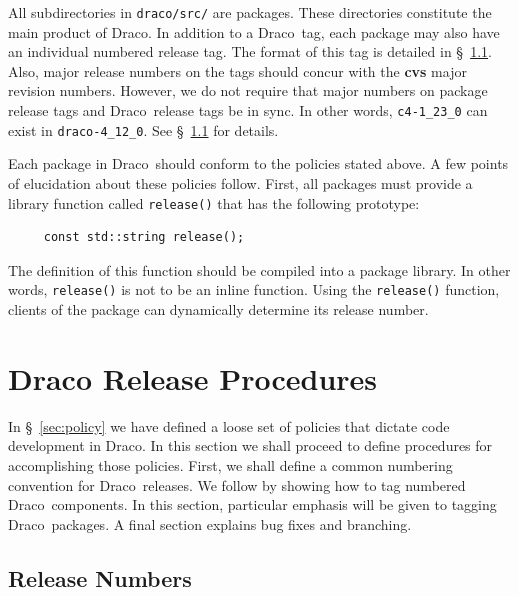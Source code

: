 \documentclass[11pt]{nmemo}
\newcommand{\draco}{{\normalfont\normalsize\sffamily Draco}}
\newcommand{\stable}{{\normalfont\normalsize\ttfamily last\_stable}}
\begin{document}
All subdirectories in \texttt{draco/src/} are packages.  These
directories constitute the main product of \draco.  In addition to a
\draco\ tag, each package may also have an individual numbered release
tag.  The format of this tag is detailed in \S~\ref{sec:rel_num}.
Also, major release numbers on the tags should concur with the {\bf
  cvs} major revision numbers.  However, we do not require that major
numbers on package release tags and \draco\ release tags be in sync.
In other words, \texttt{c4-1\_23\_0} can exist in
\texttt{draco-4\_12\_0}.  See \S~\ref{sec:rel_num} for details.

Each package in \draco\ should conform to the policies stated above.
A few points of elucidation about these policies follow.  First, all 
packages must provide a library function called \texttt{release()}
that has the following prototype:
\begin{verbatim}
     const std::string release();
\end{verbatim}
The definition of this function should be compiled into a package
library.  In other words, \texttt{release()} is not to be an inline
function.  Using the \texttt{release()} function, clients of the
package can dynamically determine its release number.  


\section{Draco Release Procedures}
\label{sec:procedures}

In \S~\ref{sec:policy} we have defined a loose set of policies that
dictate code development in \draco.  In this section we shall proceed
to define procedures for accomplishing those policies.  First, we
shall define a common numbering convention for \draco\ releases.  
We follow by showing how to tag numbered \draco\ components.  In this
section, particular emphasis will be given to tagging
\draco\ packages.  A final section explains bug fixes and branching.

\subsection{Release Numbers}
\label{sec:rel_num}
\end{document}
